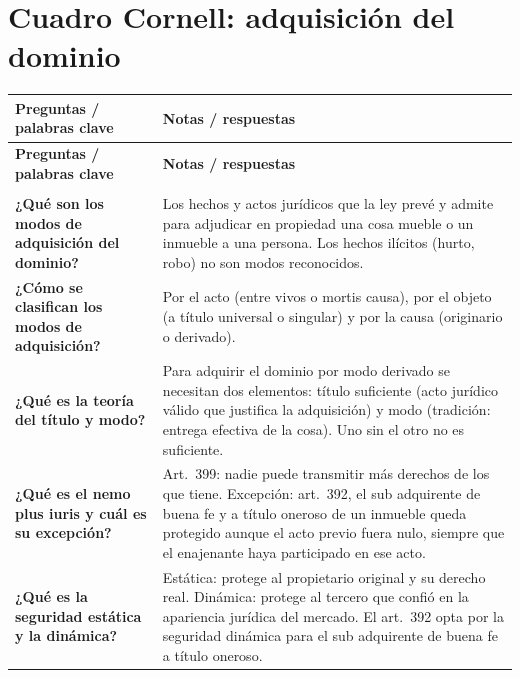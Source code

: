 \documentclass[12pt,oneside]{book}
\begin{document}
\section{Cuadro Cornell: adquisición del dominio}

\begin{longtable}{
    >{\raggedright\arraybackslash}p{}
    >{\raggedright\arraybackslash}p{}
}
\toprule
\textbf{Preguntas / palabras clave} & \textbf{Notas / respuestas} \\
\midrule
\endfirsthead
\toprule
\textbf{Preguntas / palabras clave} & \textbf{Notas / respuestas} \\
\midrule
\endhead
\midrule
\multicolumn{2}{r}{\small\itshape continúa en la página siguiente} \\
\endfoot
\bottomrule
\endlastfoot

\textbf{¿Qué son los modos de adquisición del dominio?} &
Los hechos y actos jurídicos que la ley prevé y admite para adjudicar en propiedad una cosa mueble o un inmueble a una persona. Los hechos ilícitos (hurto, robo) no son modos reconocidos. \\

\textbf{¿Cómo se clasifican los modos de adquisición?} &
Por el acto (entre vivos o mortis causa), por el objeto (a título universal o singular) y por la causa (originario o derivado). \\

\textbf{¿Qué es la teoría del título y modo?} &
Para adquirir el dominio por modo derivado se necesitan dos elementos: título suficiente (acto jurídico válido que justifica la adquisición) y modo (tradición: entrega efectiva de la cosa). Uno sin el otro no es suficiente. \\

\textbf{¿Qué es el nemo plus iuris y cuál es su excepción?} &
Art.~399: nadie puede transmitir más derechos de los que tiene. Excepción: art.~392, el sub adquirente de buena fe y a título oneroso de un inmueble queda protegido aunque el acto previo fuera nulo, siempre que el enajenante haya participado en ese acto. \\

\textbf{¿Qué es la seguridad estática y la dinámica?} &
Estática: protege al propietario original y su derecho real. Dinámica: protege al tercero que confió en la apariencia jurídica del mercado. El art.~392 opta por la seguridad dinámica para el sub adquirente de buena fe a título oneroso. \\


\end{longtable}
\end{document}
